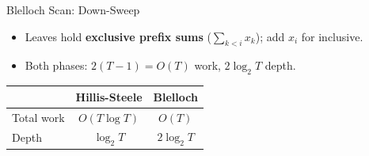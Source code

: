 \begin{frame}{Blelloch Scan: Down-Sweep}
  \begin{itemize}
    \item Leaves hold \textbf{exclusive prefix sums} ($\sum_{k<i} x_k$); add $x_i$ for inclusive.
    \item Both phases: $2(T{-}1) = O(T)$ work, $2\log_2 T$ depth.
  \end{itemize}

  \begin{center}
    \begin{tabular}{lcc}
      \toprule
      & \textbf{Hillis-Steele} & \textbf{Blelloch} \\
      \midrule
      Total work & $O(T\log T)$ & $O(T)$ \\
      Depth      & $\log_2 T$ & $2\log_2 T$ \\
      \bottomrule
    \end{tabular}
  \end{center}
\end{frame}

